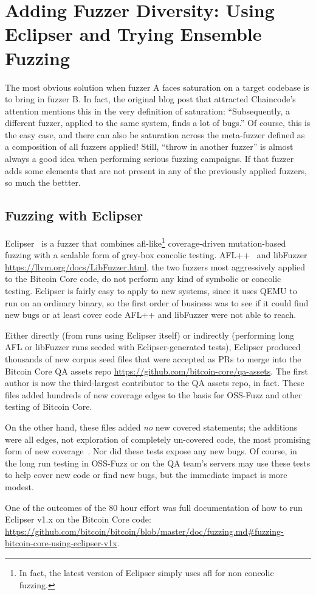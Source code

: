 \section{Adding Fuzzer Diversity: Using Eclipser and Trying Ensemble Fuzzing}

The most obvious solution when fuzzer A faces saturation on a target codebase is to bring in fuzzer B.  In fact, the original blog post that attracted Chaincode's attention mentions this in the very definition of saturation:  ``Subsequently, a different fuzzer, applied to the same system, finds a lot of bugs.''  Of course, this is the easy case, and there can also be saturation across the meta-fuzzer defined as a composition of all fuzzers applied!  Still, ``throw in another fuzzer'' is almost always a good idea when performing serious fuzzing campaigns.  If that fuzzer adds some elements that are not present in any of the previously applied fuzzers, so much the bettter.

\subsection{Fuzzing with Eclipser}

\begin{sloppypar}
Eclipser~\cite{eclipser} is a fuzzer that combines afl-like\footnote{In fact, the latest version of Eclipser simply uses afl for non concolic fuzzing.} coverage-driven mutation-based fuzzing with a scalable form of grey-box concolic testing.  AFL++~\cite{AFLplusplus-Woot20} and libFuzzer \url{https://llvm.org/docs/LibFuzzer.html}, the two fuzzers most aggressively applied to the Bitcoin Core code, do not perform any kind of symbolic or concolic testing.  Eclipser is fairly easy to apply to new systems, since it uses QEMU to run on an ordinary binary, so the first order of business was to see if it could find new bugs or at least cover code AFL++ and libFuzzer were not able to reach.

Either directly (from runs using Eclipser itself) or indirectly (performing long AFL or libFuzzer runs seeded with Eclipser-generated tests), Eclipser produced thousands of new corpus seed files that were accepted as PRs to merge into the Bitcoin Core QA assets repo \url{https://github.com/bitcoin-core/qa-assets}.  The first author is now the third-largest contributor to the QA assets repo, in fact.  These files added hundreds of new coverage edges to the basis for OSS-Fuzz and other testing of Bitcoin Core.

On the other hand, these files added \emph{no} new covered statements; the additions were all edges, not exploration of completely un-covered code, the most promising form of new coverage~\cite{covdev,testedness}.  Nor did these tests expose any new bugs.  Of course, in the long run testing in OSS-Fuzz or on the QA team's servers may use these tests to help cover new code or find new bugs, but the immediate impact is more modest.

  One of the outcomes of the 80 hour effort was full documentation of how to run Eclipser v1.x on the Bitcoin Core code:  \url{https://github.com/bitcoin/bitcoin/blob/master/doc/fuzzing.md#fuzzing-bitcoin-core-using-eclipser-v1x}.
\end{sloppypar}


